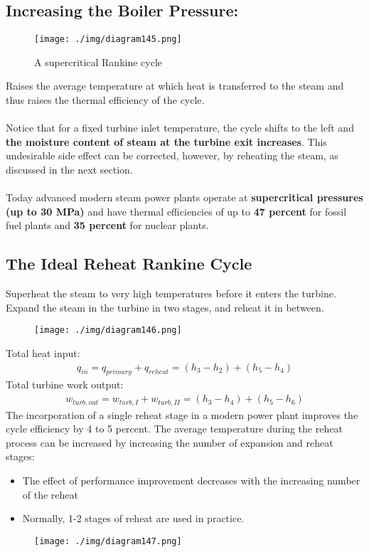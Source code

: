 \subsection*{Increasing the Boiler Pressure:}
\begin{figure}[H]
  \centering
  \texttt{[image: ./img/diagram145.png]}
  \caption{A supercritical Rankine cycle}
\end{figure}
Raises the average temperature at which heat is transferred to the steam and thus raises the thermal efficiency of the cycle. \\\\
Notice that for a fixed turbine inlet temperature, the cycle shifts to the left and \textbf{the moisture content of steam at the turbine exit increases}. This undesirable side effect can be corrected, however, by reheating the steam, as discussed in the next section. \\\\
Today advanced modern steam power plants operate at \textbf{supercritical pressures (up to 30 MPa)} and have thermal efficiencies of up to \textbf{47 percent} for fossil fuel plants and \textbf{35 percent} for nuclear plants.
\subsection{The Ideal Reheat Rankine Cycle}
Superheat the steam to very high temperatures before it enters the turbine.
Expand the steam in the turbine in two stages, and reheat it in between.
\begin{figure}[H]
  \centering
  \texttt{[image: ./img/diagram146.png]}
  \caption{}
\end{figure}
Total heat input:
\begin{gather}
  q_{in} = q_{primary} + q_{reheat} = (h_3-h_2) + (h_5-h_4)
\end{gather}
Total turbine work output:
\begin{gather}
  w_{turb,out} = w_{turb,I} + w_{turb,II} = (h_3-h_4) + (h_5-h_6)
\end{gather}
The incorporation of a single reheat stage in a modern power plant improves the cycle efficiency by 4 to 5 percent. The average temperature during the reheat process can be increased by increasing the number of expansion and reheat stages:
\begin{itemize}[noitemsep]
  \item The effect of performance improvement decreases with the increasing number of the reheat
  \item Normally, 1-2 stages of reheat are used in practice.
\end{itemize}
\begin{figure}[H]
  \centering
  \texttt{[image: ./img/diagram147.png]}
  \caption{}
\end{figure}
